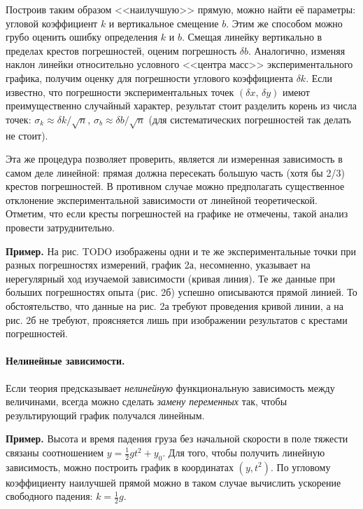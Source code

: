 \documentclass[10pt]{article}
\begin{document}
Построив таким образом <<наилучшую>> прямую,
можно найти её параметры: угловой коэффициент $k$ и вертикальное
смещение $b$. Этим же способом можно грубо оценить ошибку определения
$k$ и $b$. Смещая линейку вертикально в пределах крестов погрешностей,
оценим погрешность $\delta b$. Аналогично, изменяя наклон линейки
относительно условного <<центра масс>>
экспериментального графика, получим оценку для погрешности углового
коэффициента $\delta k$. Если известно, что погрешности экспериментальных
точек $\left(\delta x,\,\delta y\right)$ имеют преимущественно случайный
характер, результат стоит разделить корень из числа точек: $\sigma_{k}\approx\delta k/\sqrt{n}$,
$\sigma_{b}\approx\delta b/\sqrt{n}$ (для систематических погрешностей
так делать не стоит).

Эта же процедура позволяет проверить, является ли измеренная зависимость
в самом деле линейной: прямая должна пересекать большую часть (хотя
бы 2/3) крестов погрешностей. В противном случае можно предполагать
существенное отклонение экспериментальной зависимости от линейной
теоретической. Отметим, что если кресты погрешностей на графике не
отмечены, такой анализ провести затруднительно. 

\textbf{\footnotesize{}Пример.}{\footnotesize{} На рис. TODO изображены
одни и те же экспериментальные точки при разных погрешностях измерений,
график 2а, несомненно, указывает на нерегулярный ход изучаемой зависимости
(кривая линия). Те же данные при больших погрешностях опыта (рис.
2б) успешно описываются прямой линией. То обстоятельство, что данные
на рис. 2а требуют проведения кривой линии, а на рис. 2б не требуют,
проясняется лишь при изображении результатов с крестами погрешностей.}{\footnotesize\par}

\paragraph{Нелинейные зависимости.}

Если теория предсказывает \emph{нелинейную }функциональную зависимость
между величинами, всегда можно сделать \emph{замену переменных} так,
чтобы результирующий график получался линейным.

\textbf{\footnotesize{}Пример.}{\footnotesize{} Высота и время падения
груза без начальной скорости в поле тяжести связаны соотношением $y=\frac{1}{2}gt^{2}+y_{0}$.
Для того, чтобы получить линейную зависимость, можно построить график
в координатах $\left(y,t^{2}\right)$. По угловому коэффициенту наилучшей
прямой можно в таком случае вычислить ускорение свободного падения:
$k=\frac{1}{2}g$.}{\footnotesize\par}
\end{document}
